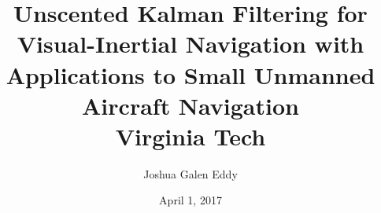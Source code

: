 \documentclass[11 pt]{report}
\begin{document}
\title{
	{Unscented Kalman Filtering for Visual-Inertial Navigation with Applications to Small Unmanned Aircraft Navigation}\\
	\vspace{1 em}
	{\Large Virginia Tech}
}
\author{Joshua Galen Eddy}
\date{April 1, 2017}

\maketitle


%

\begin{comment}
\tableofcontents
\listoffigures
\listoftables
\end{comment}





%

\begin{comment}
\chapter{Experimental Design}
\chapter{Experimental Results}
\chapter{Conclusions}
\chapter{Future Work}
\appendix
\end{comment}

\clearpage
{}

 
\end{document}
